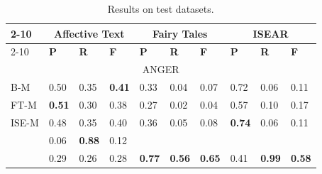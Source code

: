\documentclass[11pt]{article}
\begin{document}
\begin{table}[!h]
\caption{Results on test datasets.\label{final_results}}
\centering
\begin{tabular}{|l||l|l|l||l|l|l||l|l|l|}
\cline{2-10}
    \multicolumn{1}{}{{}} & 
    \multicolumn{3}{|c||}{{Affective Text}} & 
    \multicolumn{3}{|c||}{{Fairy Tales}} & 
    \multicolumn{3}{|c|}{{ISEAR}}  \\
        
\cline{2-10}
\cline{2-10}                      
     \multicolumn{1}{c|}{{}} & 
    \textbf{P} & 
    \textbf{R} & 
    \textbf{F} & 
    \textbf{P} & 
    \textbf{R} & 
    \textbf{F} & 
    \textbf{P} & 
    \textbf{R} & 
    \textbf{F} \\ 
     
\hline                      

    \multicolumn{10}{|c|}{{ ANGER}} \\                 

                                        \hline
    \tiny{B-M} & 
    \footnotesize{0.50} & 
    \footnotesize{0.35} & 
    \footnotesize{\textbf{0.41}} & 
    \footnotesize{0.33} & 
    \footnotesize{0.04} & 
    \footnotesize{0.07} & 
    \footnotesize{0.72} & 
    \footnotesize{0.06} & 
    \footnotesize{0.11} \\ 

\hline
    \tiny{FT-M} & 
    \footnotesize{\textbf{0.51}} & 
    \footnotesize{0.30} & 
    \footnotesize{0.38} &
    \footnotesize{0.27} & 
    \footnotesize{0.02} & 
    \footnotesize{0.04} & 
    \footnotesize{0.57} & 
    \footnotesize{0.10} & 
    \footnotesize{0.17} \\ 

\hline
    \tiny{ISE-M} & 
    \footnotesize{0.48} & 
    \footnotesize{0.35} & 
    \footnotesize{0.40} & 
    \footnotesize{0.36} & 
    \footnotesize{0.05} & 
    \footnotesize{0.08} & 
    \footnotesize{\textbf{0.74}} & 
    \footnotesize{0.06} & 
    \footnotesize{0.11} \\ 


\hline
    \tiny{\cite{strapparava2008learning} } &
    \footnotesize{0.06} & 
    \footnotesize{\textbf{0.88}} & 
    \footnotesize{0.12} &
    &
    &
    &
    &
    &
    \\

\hline
    \tiny{\cite{kim2010evaluation} } &
    \footnotesize{0.29} & 
    \footnotesize{0.26} & 
    \footnotesize{{0.28}} &
    \footnotesize{\textbf{0.77}} & 
    \footnotesize{\textbf{0.56}} & 
    \footnotesize{\textbf{0.65}} &
    \footnotesize{0.41} & 
    \footnotesize{\textbf{0.99}} & 
    \footnotesize{\textbf{0.58}} \\
    

\end{tabular}
\end{table}
\end{document}
